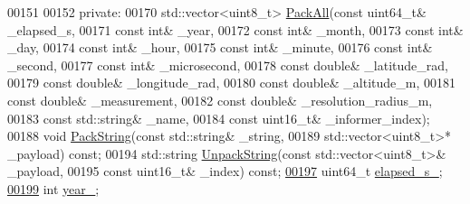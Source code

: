\begin{DoxyCode}
00151 
00152  \textcolor{keyword}{private}:
00170   std::vector<uint8\_t> \hyperlink{classosse_1_1collaborate_1_1_packet_raw_a9f38c8bdbccf25e869a0d0dbf02c312a}{PackAll}(\textcolor{keyword}{const} uint64\_t& \_elapsed\_s,
00171                                \textcolor{keyword}{const} \textcolor{keywordtype}{int}& \_year,
00172                                \textcolor{keyword}{const} \textcolor{keywordtype}{int}& \_month,
00173                                \textcolor{keyword}{const} \textcolor{keywordtype}{int}& \_day,
00174                                \textcolor{keyword}{const} \textcolor{keywordtype}{int}& \_hour,
00175                                \textcolor{keyword}{const} \textcolor{keywordtype}{int}& \_minute,
00176                                \textcolor{keyword}{const} \textcolor{keywordtype}{int}& \_second,
00177                                \textcolor{keyword}{const} \textcolor{keywordtype}{int}& \_microsecond,
00178                                \textcolor{keyword}{const} \textcolor{keywordtype}{double}& \_latitude\_rad,
00179                                \textcolor{keyword}{const} \textcolor{keywordtype}{double}& \_longitude\_rad,
00180                                \textcolor{keyword}{const} \textcolor{keywordtype}{double}& \_altitude\_m,
00181                                \textcolor{keyword}{const} \textcolor{keywordtype}{double}& \_measurement,
00182                                \textcolor{keyword}{const} \textcolor{keywordtype}{double}& \_resolution\_radius\_m,
00183                                \textcolor{keyword}{const} std::string& \_name,
00184                                \textcolor{keyword}{const} uint16\_t& \_informer\_index);
00188   \textcolor{keywordtype}{void} \hyperlink{classosse_1_1collaborate_1_1_packet_raw_a0a3698124ebe1bb48f2cf3158035ea3d}{PackString}(\textcolor{keyword}{const} std::string& \_string,
00189                   std::vector<uint8\_t>* \_payload) \textcolor{keyword}{const};
00194   std::string \hyperlink{classosse_1_1collaborate_1_1_packet_raw_a852c9461111a6dff32bf1374d8bf27e0}{UnpackString}(\textcolor{keyword}{const} std::vector<uint8\_t>& \_payload,
00195                            \textcolor{keyword}{const} uint16\_t& \_index) \textcolor{keyword}{const};
\hyperlink{classosse_1_1collaborate_1_1_packet_raw_aad8310207b7e3d74633874497145331d}{00197}   uint64\_t \hyperlink{classosse_1_1collaborate_1_1_packet_raw_aad8310207b7e3d74633874497145331d}{elapsed\_s\_};
\hyperlink{classosse_1_1collaborate_1_1_packet_raw_ac5502a36a4d412da7c1bcf23d1d603df}{00199}   \textcolor{keywordtype}{int} \hyperlink{classosse_1_1collaborate_1_1_packet_raw_ac5502a36a4d412da7c1bcf23d1d603df}{year\_};

\end{DoxyCode}
